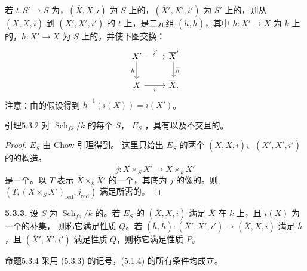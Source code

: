 若 $t:S'\to S$ 为，$(\overline X,X,i)$ 为 $S$ 上的，$(\overline X',X',i')$ 为 $S'$ 上的，则从 $(\overline X,X,i)$ 到 $(\overline X',X',i')$ 的 $t$ 上，是二元组 $(\overline h,h)$，其中 $\overline h:\overline X'\to\overline X$ 为 $k$ 上的，$h:X'\to X$ 为 $S$ 上的，并使下图交换：
\[
\begin{tikzcd}
X'\arrow[r,"i'"]\arrow[d,"h"']&\overline X'\arrow[d,"\overline h"]\\
X\arrow[r,"i"']&\overline X.
\end{tikzcd}
\]
注意：由的假设得到 $\overline h^{-1}(i(X))=i(X')$。
\begin{SGAresult}{引理}{5.3.2}
对 $\operatorname{Sch}_{fs}/k$ 的每个 $S$， $E_S$ ，具有以及不交且的。
\end{SGAresult}
\begin{proof}
$E_S$ 由 Chow 引理得到。
这里只给出 $E_S$ 的两个 $(\overline X,X,i)$、$(\overline X',X',i')$ 的的构造。
\[
j:X\times_S X'\longrightarrow\overline X\times_k\overline X'
\]
是一个。以 $T$ 表示 $\overline X\times_k\overline X'$ 的一个，其底为 $j$ 的像的。则 $(T,(X\times_S X')_{\mathrm{red}},j_{\mathrm{red}})$ 满足所需的。
\end{proof}
\textbf{5.3.3.} 设 $S$ 为 $\operatorname{Sch}_{fs}/k$ 的。若 $E_S$ 的 $(\overline X,X,i)$ 满足 $\overline X$ 在 $k$ 上，且 $i(X)$ 为一个的补集，
则称它满足性质 $Q$。若 $(\overline h,h):(\overline X',X',i')\to(\overline X,X,i)$ 满足 $\overline h$ ，且 $(\overline X',X',i')$ 满足性质 $Q$，则称它满足性质 $P$。
\begin{SGAresult}{命题}{5.3.4}
采用 (5.3.3) 的记号，(5.1.4) 的所有条件均成立。
\end{SGAresult}
